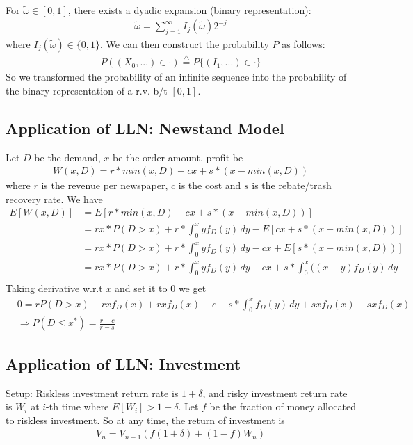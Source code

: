 For $\tilde{\omega} \in [0,1]$, there exists a dyadic expansion (binary representation): 
    \begin{align*}
        \tilde{\omega} = \sum_{j=1}^\infty I_j(\tilde{\omega}) 2^{-j}
    \end{align*}
where $I_j(\tilde{\omega})\in \{ 0, 1 \}$.  We can then construct the probability $P$ as follows: 
    \begin{align*}
        P((X_0, ...)\in \cdot) \overset{\triangle}{=} \tilde{P}\{ (I_1, ...) \in \cdot \} 
    \end{align*}
So we transformed the probability of an infinite sequence into the probability of the binary representation of a r.v. b/t $[0,1]$. 



\subsection{Application of LLN: Newstand Model} 
Let $D$ be the demand, $x$ be the order amount, profit be 
    \begin{align*}
        W(x,D)=r * min(x,D) - cx + s * (x - min(x,D))
    \end{align*}
where $r$ is the revenue per newspaper, $c$ is the cost and $s$ is the rebate/trash recovery rate. We have     \begin{align*}
    E[W(x,D)] 
    & = E[r * min(x,D) - cx + s * (x - min(x,D))]\\
    & = r x * P(D>x) + r * \int_0^x y f_D(y) \, dy - E[cx + s * (x - min(x,D))]\\
    & = r x * P(D>x) + r * \int_0^x y f_D(y) \, dy - cx + E[s * (x - min(x,D))]\\
    & = r x * P(D>x) + r * \int_0^x y f_D(y) \, dy - cx + s * \int_0^x((x-y) f_D(y) \, dy\\
\end{align*}
Taking derivative w.r.t $x$ and set it to 0 we get 
    \begin{align*}
        & 0 = r P(D>x) - rxf_D(x) + rx f_D(x) - c + s * \int_0^x f_D(y) \, dy + sx f_D(x) - sx f_D(x) \\
        & \Longrightarrow P(D \leq x^*) = \frac{r-c}{r-s}
    \end{align*}

\subsection{Application of LLN: Investment} 
Setup: Riskless investment return rate is $1 + \delta$, and risky investment return rate is $W_i$ at $i$-th time where $E[W_i] > 1 + \delta$. Let $f$ be the fraction of money allocated to riskless investment. So at any time, the return of investment is 
    \begin{align*}
        V_n = V_{n-1} ( f(1+\delta) + (1-f) W_n)
    \end{align*}


